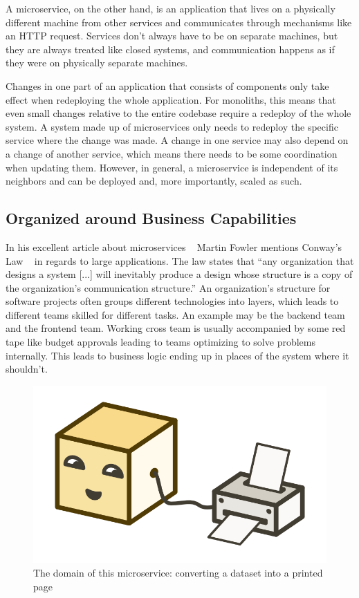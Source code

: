 A microservice, on the other hand, is an application that lives on a physically different machine from other services and communicates through mechanisms like an HTTP request. Services don't always have to be on separate machines, but they are always treated like closed systems, and communication happens as if they were on physically separate machines.

Changes in one part of an application that consists of components only take effect when redeploying the whole application. For monoliths, this means that even small changes relative to the entire codebase require a redeploy of the whole system. A system made up of microservices only needs to redeploy the specific service where the change was made. A change in one service may also depend on a change of another service, which means there needs to be some coordination when updating them. However, in general, a microservice is independent of its neighbors and can be deployed and, more importantly, scaled as such.


\subsection{Organized around Business Capabilities}
\label{sec:theory:what:capabilities}

In his excellent article about microservices ~\cite{microservices.2014} Martin Fowler mentions Conway's Law ~\cite{conway.1968} in regards to large applications. The law states that ``any organization that designs a system [...] will inevitably produce a design whose structure is a copy of the organization's communication structure.'' An organization's structure for software projects often groups different technologies into layers, which leads to different teams skilled for different tasks. An example may be the backend team and the frontend team. Working cross team is usually accompanied by some red tape like budget approvals leading to teams optimizing to solve problems internally. This leads to business logic ending up in places of the system where it shouldn't.

\begin{figure}[ht]
  \centering
  \includegraphics[width=0.4\linewidth]{assets/illustration-microservice-printer.png}
  \caption{The domain of this microservice: converting a dataset into a printed page}
\end{figure}

